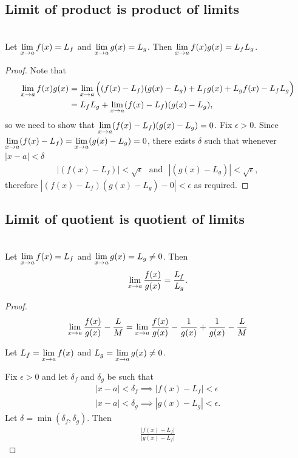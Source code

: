 \subsection{Limit of product is product of limits}
\begin{theorem*}\label{limit-of-product}~\\
  Let $\limxa f(x) = L_f$ and $\limxa g(x) = L_g$. Then
  $\limxa f(x)g(x) = L_fL_g$.
\end{theorem*}

\begin{proof}
  Note that
  \begin{align*}
    \limxa f(x)g(x) &= \limxa \Big((f(x) - L_f)(g(x) - L_g) + L_fg(x) + L_gf(x) - L_fL_g\Big)\\
                    &= L_fL_g + \limxa (f(x) - L_f)(g(x) - L_g),
  \end{align*}
  so we need to show that $\limxa (f(x) - L_f)(g(x) - L_g) = 0$. Fix $\epsilon > 0$. Since
  $\limxa (f(x) - L_f) = \limxa (g(x) - L_g) = 0$, there exists $\delta$ such that whenever
  $|x - a| < \delta$
  \begin{align*}
    |(f(x) - L_f)| < \sqrt \epsilon ~~~\text{and}~~~|(g(x) - L_g)| < \sqrt \epsilon,
  \end{align*}
  therefore $|(f(x) - L_f)(g(x) - L_g) - 0| < \epsilon$ as required.
\end{proof}

\subsection{Limit of quotient is quotient of limits}
\begin{theorem*}~\\
  Let $\limxa f(x) = L_f$ and $\limxa g(x) = L_g \neq 0$. Then
  \begin{align*}
    \limxa \frac{f(x)}{g(x)} = \frac{L_f}{L_g}.
  \end{align*}
\end{theorem*}

\begin{proof}
  \begin{align*}
    \limxa \frac{f(x)}{g(x)} - \frac{L}{M}
    = \limxa \frac{f(x)}{g(x)} - \frac{1}{g(x)} + \frac{1}{g(x)} - \frac{L}{M}
  \end{align*}

  Let $L_f = \limxa f(x)$ and $L_g = \limxa g(x) \neq 0$.

  Fix $\epsilon > 0$ and let $\delta_f$ and $\delta_g$ be such that
  \begin{align*}
    |x - a| < \delta_f \implies |f(x) - L_f| < \epsilon\\
    |x - a| < \delta_g \implies |g(x) - L_g| < \epsilon.
  \end{align*}
  Let $\delta = \min(\delta_f, \delta_g)$. Then
  \begin{align*}
    \frac{|f(x) - L_f|}{|g(x) - L_f|}
  \end{align*}
\end{proof}



